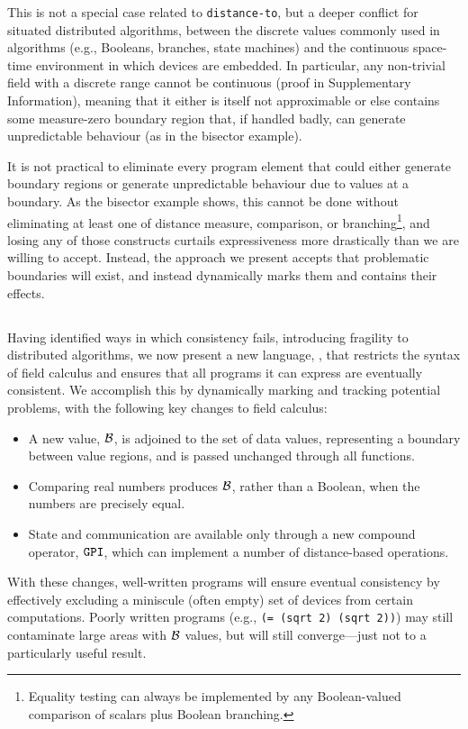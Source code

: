 \documentclass[12pt,a4paper,twoside,openright]{book}
\begin{document}
This is not a special case related to {\tt distance-to}, but a deeper conflict for situated distributed algorithms, between the discrete values commonly used in algorithms (e.g., Booleans, branches, state machines) and the continuous space-time environment in which devices are embedded.
%
In particular, any non-trivial field with a discrete range cannot be continuous (proof in Supplementary Information), meaning that it either is itself not approximable or else contains some measure-zero boundary region that, if handled badly, can generate unpredictable behaviour (as in the bisector example).

It is not practical to eliminate every program element that could either generate boundary regions or generate unpredictable behaviour due to values at a boundary.
%
As the bisector example shows, this cannot be done without eliminating at least one of distance measure, comparison, or branching\footnote{Equality testing can always be implemented by any Boolean-valued comparison of scalars plus Boolean branching.}, and losing any of those constructs curtails expressiveness more drastically than we are willing to accept.
%
Instead, the approach we present accepts that problematic boundaries will exist, and instead dynamically marks them and contains their effects.

\subsection{\calculus}
\label{s:calculus}

Having identified ways in which consistency fails, introducing fragility to distributed algorithms, we now present a new language, \calculus{}, that restricts the syntax of field calculus and ensures that all programs it can express are eventually consistent.
%
We accomplish this by dynamically marking and tracking potential problems, with the following key changes to field calculus:
\begin{itemize}
\item A new value, $\mathcal{B}$, is adjoined to the set of data values, representing a boundary between value regions, and is passed unchanged through all functions.
\item Comparing real numbers produces $\mathcal{B}$, rather than a Boolean, when the numbers are precisely equal.
\item State and communication are available only through a new compound operator, $\texttt{GPI}$, which can implement a number of distance-based operations.
\end{itemize}
With these changes, well-written programs will ensure eventual consistency by effectively excluding a miniscule (often empty) set of devices from certain computations.
%
Poorly written programs (e.g., {\tt (= (sqrt 2) (sqrt 2))}) may still contaminate large areas with $\mathcal{B}$ values, but will still converge---just not to a particularly useful result.
\end{document}

